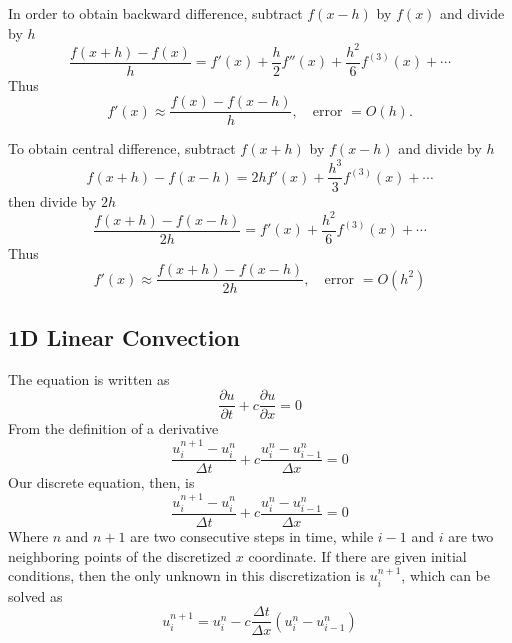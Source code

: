 \documentclass[../../../main.tex]{subfiles}
\begin{document}
In order to obtain backward difference, subtract $f(x-h)$ by $f(x)$ and divide by $h$
\begin{equation*}
    \frac{f(x+h) - f(x)}{h} = f'(x) + \frac{h}{2} f''(x) + \frac{h^2}{6} f^{(3)}(x) +\cdots
\end{equation*}
Thus
\begin{equation*}
    f'(x) \approx \frac{f(x) - f(x-h)}{h}, \quad \text{error } = O(h).
\end{equation*}

To obtain central difference, subtract $f(x+h)$ by $f(x-h)$ and divide by $h$
\begin{equation*}
    f(x+h) - f(x-h) = 2h f'(x) + \frac{h^3}{3} f^{(3)}(x) +\cdots
\end{equation*}
then divide by $2h$
\begin{equation*}
    \frac{f(x+h) - f(x-h)}{2h} = f'(x) + \frac{h^2}{6} f^{(3)}(x) +\cdots
\end{equation*}
Thus
\begin{equation*}
    f'(x) \approx \frac{f(x+h) - f(x-h)}{2h}, \quad \text{error } = O(h^2)
\end{equation*}

\subsection{1D Linear Convection}
The equation is written as 
\begin{equation*}
    \frac{\partial u}{\partial t} + c \frac{\partial u}{\partial x} = 0   
\end{equation*}
From the definition of a derivative
\begin{equation*}
    \frac{u_i^{n+1}-u_i^n}{\Delta t} + c \frac{u_i^n - u_{i-1}^n}{\Delta x} = 0 
\end{equation*}
Our discrete equation, then, is
\begin{equation*}
    \frac{u_i^{n+1}-u_i^n}{\Delta t} + c \frac{u_i^n - u_{i-1}^n}{\Delta x} = 0 
\end{equation*}
Where $n$ and $n+1$ are two consecutive steps in time, while $i-1$ and $i$ are two neighboring points of the discretized $x$ coordinate. 
If there are given initial conditions, then the only unknown in this discretization is $u_i^{n+1}$, which can be solved as 
\begin{equation*}
    u_i^{n+1} = u_i^n - c \frac{\Delta t}{\Delta x}(u_i^n-u_{i-1}^n)
\end{equation*}
\end{document}
